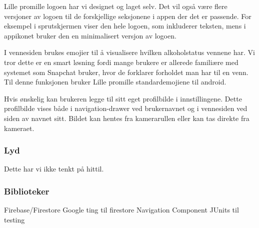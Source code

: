 Lille promille logoen har vi designet og laget selv. Det vil også være flere versjoner av logoen til de forskjellige seksjonene i appen der det er passende. For eksempel i sprutskjermen viser den hele logoen, som inkluderer teksten, mens i appikonet bruker den en minimalisert versjon av logoen.

I vennesiden brukes emojier til å visualisere hvilken alkoholstatus vennene har. Vi tror dette er en smart løsning fordi mange brukere er allerede familiære med systemet som Snapchat bruker, hvor de forklarer forholdet man har til en venn. Til denne funksjonen bruker Lille promille standardemojiene til android.

Hvis ønskelig kan brukeren legge til sitt eget profilbilde i innstillingene. Dette profilbilde vises både i navigation-drawer ved brukernavnet og i vennesiden ved siden av navnet sitt. Bildet kan hentes fra kamerarullen eller kan tas direkte fra kameraet.

\subsubsection{Lyd}
Dette har vi ikke tenkt på hittil.

\subsubsection{Biblioteker}
Firebase/Firestore
Google ting til firestore
Navigation Component
JUnits til testing